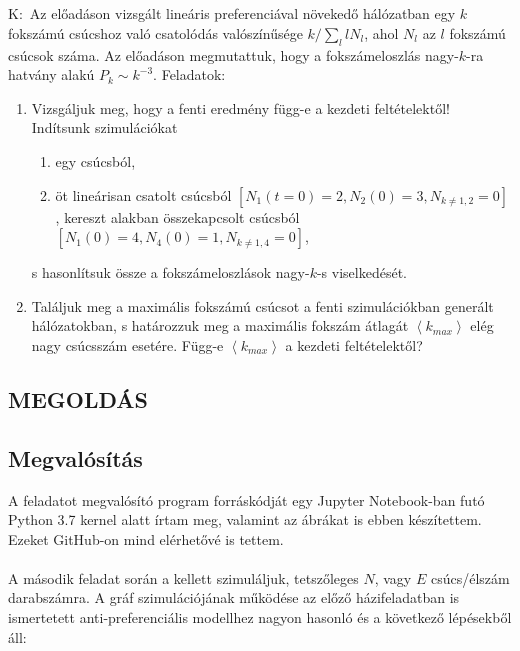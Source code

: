\section{} \label{sec:2}
K:\ Az előadáson vizsgált lineáris preferenciával növekedő hálózatban egy $k$ fokszámú csúcshoz való csatolódás valószínűsége $k/\sum_{l} l N_{l}$, ahol $N_{l}$ az $l$ fokszámú csúcsok száma. Az előadáson megmutattuk, hogy a fokszámeloszlás nagy-$k$-ra hatvány alakú $P_{k} \sim k^{-3}$.
Feladatok:
\begin{enumerate}[label=\roman*]
    \item Vizsgáljuk meg, hogy a fenti eredmény függ-e a kezdeti feltételektől! Indítsunk szimulációkat
    \begin{enumerate}
        \item egy csúcsból,
        \item öt lineárisan csatolt csúcsból $[N_{1} \left( t = 0 \right) = 2, N_{2} \left( 0 \right) = 3, N_{k \neq 1,2} = 0]$,
         kereszt alakban összekapcsolt csúcsból $[N_{1} \left( 0 \right) = 4, N_{4} \left( 0 \right) = 1, N_{k \neq 1,4} = 0]$,
    \end{enumerate}
    s hasonlítsuk össze a fokszámeloszlások nagy-$k$-s viselkedését.
    \item Találjuk meg a maximális fokszámú csúcsot a fenti szimulációkban generált hálózatokban, s határozzuk meg a maximális fokszám átlagát $\left< k_{max} \right>$ elég nagy csúcsszám esetére. Függ-e $\left< k_{max} \right>$ a kezdeti feltételektől?
\end{enumerate}

\subsection*{\bfseries\normalsize\MakeUppercase{Megoldás}}

\subsection{Megvalósítás}  \label{sub:2.1}
A feladatot megvalósító program forráskódját egy Jupyter Notebook-ban futó Python 3.7 kernel alatt írtam meg, valamint az ábrákat is ebben készítettem. Ezeket GitHub-on mind elérhetővé is tettem\cite{github}.
\\ \\
A második feladat során a \pmdt kellett szimuláljuk, tetszőleges $N$, vagy $E$ csúcs/élszám darabszámra. A gráf szimulációjának működése az előző házifeladatban is ismertetett anti-preferenciális modellhez nagyon hasonló és a következő lépésekből áll:

